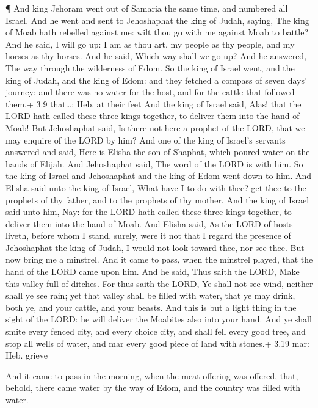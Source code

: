  ¶ And king Jehoram went out of Samaria the same time, and
numbered all Israel.  And he went and sent to Jehoshaphat
the king of Judah, saying, The king of Moab hath rebelled against me:
wilt thou go with me against Moab to battle? And he said, I will go up:
I am as thou art, my people as thy people, and my horses as thy horses.
 And he said, Which way shall we go up? And he answered, The
way through the wilderness of Edom.  So the king of Israel
went, and the king of Judah, and the king of Edom: and they fetched a
compass of seven days' journey: and there was no water for the host, and
for the cattle that followed them.+ 3.9 that\ldots: Heb. at their feet
 And the king of Israel said, Alas! that the LORD hath
called these three kings together, to deliver them into the hand of
Moab!  But Jehoshaphat said, Is there not here a prophet of
the LORD, that we may enquire of the LORD by him? And one of the king of
Israel's servants answered and said, Here is Elisha the son of Shaphat,
which poured water on the hands of Elijah.  And Jehoshaphat
said, The word of the LORD is with him. So the king of Israel and
Jehoshaphat and the king of Edom went down to him.  And
Elisha said unto the king of Israel, What have I to do with thee? get
thee to the prophets of thy father, and to the prophets of thy mother.
And the king of Israel said unto him, Nay: for the LORD hath called
these three kings together, to deliver them into the hand of Moab.
 And Elisha said, As the LORD of hosts liveth, before whom
I stand, surely, were it not that I regard the presence of Jehoshaphat
the king of Judah, I would not look toward thee, nor see thee.
 But now bring me a minstrel. And it came to pass, when the
minstrel played, that the hand of the LORD came upon him. 
And he said, Thus saith the LORD, Make this valley full of ditches.
 For thus saith the LORD, Ye shall not see wind, neither
shall ye see rain; yet that valley shall be filled with water, that ye
may drink, both ye, and your cattle, and your beasts.  And
this is but a light thing in the sight of the LORD: he will deliver the
Moabites also into your hand.  And ye shall smite every
fenced city, and every choice city, and shall fell every good tree, and
stop all wells of water, and mar every good piece of land with stones.+
3.19 mar: Heb. grieve

 And it came to pass in the morning, when the meat offering
was offered, that, behold, there came water by the way of Edom, and the
country was filled with water.

